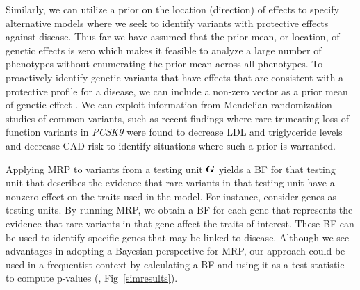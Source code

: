 Similarly, we can utilize a prior on the location (direction) of effects to specify alternative models where we seek to identify variants with protective effects against disease. Thus far we have assumed that the prior mean, or location, of genetic effects is zero which makes it feasible to analyze a large number of phenotypes without enumerating the prior mean across all phenotypes. To proactively identify genetic variants that have effects that are consistent with a protective profile for a disease, we can include a non-zero vector as a prior mean of genetic effect . We can exploit information from Mendelian randomization studies of common variants, such as recent findings where rare truncating loss-of-function variants in {\it PCSK9} were found to decrease LDL and triglyceride levels and decrease CAD risk\cite{cohen2005low,pcsk9,do2013common,cohorts2014loss} to identify situations where such a prior is warranted.

Applying MRP to variants from a testing unit ${\boldsymbol G}$ yields a BF for that testing unit that describes the evidence that rare variants in that testing unit have a nonzero effect on the traits used in the model. For instance, consider genes as testing units. By running MRP, we obtain a BF for each gene that represents the evidence that rare variants in that gene affect the traits of interest. These BF can be used to identify specific genes that may be linked to disease. Although we see advantages in adopting a Bayesian perspective for MRP, our approach could be used in a frequentist context by calculating a BF and using it as a test statistic to compute p-values (, Fig~\ref{simresults}).
 
